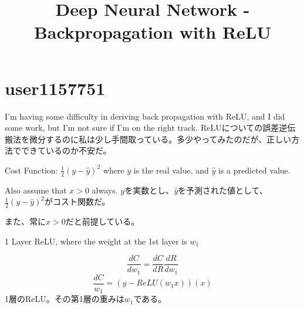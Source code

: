 \documentclass[uplatex,dvipdfmx]{jsarticle} \usepackage{amsmath,amssymb,bm}
\title{Deep Neural Network - Backpropagation with ReLU} \author{} \date{}
\begin{document}
\maketitle

\section*{user1157751}
\begin{paracol}{2}
I'm having some difficulty in deriving back propagation with ReLU, and I did some work, but I'm not sure if I'm on the right track.
\switchcolumn
ReLUについての誤差逆伝搬法を微分するのに私は少し手間取っている。多少やってみたのだが、正しい方法でできているのか不安だ。
\end{paracol}
\vspace{\baselineskip}
\begin{paracol}{2}
Cost Function: $\frac12(y-\hat{y})^2$ where $y$ is the real value, and $\hat{y}$ is a predicted value.

Also assume that $x>0$ always.
\switchcolumn
$y$を実数とし、$\hat{y}$を予測された値として、$\frac12(y-\hat{y})^2$がコスト関数だ。

また、常に$x>0$だと前提している。
\end{paracol}
\vspace{\baselineskip}
\begin{paracol}{2}
1 Layer ReLU, where the weight at the 1st layer is $w_1$

$$\frac{dC}{dw_1}=\frac{dC}{dR}\frac{dR}{dw_1}$$
$$\frac{dC}{w_1}=(y-ReLU(w_1x))(x)$$
\switchcolumn
1層のReLU。その第1層の重みは$w_1$である。
\end{paracol}
\end{document}
